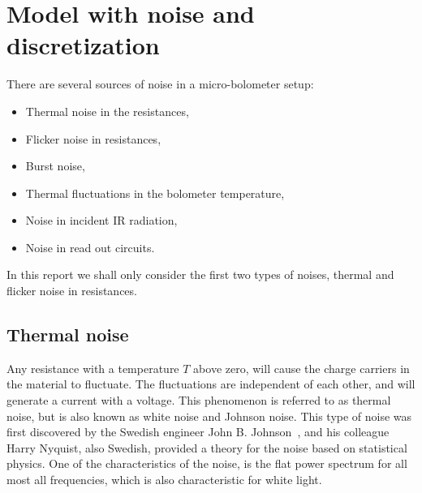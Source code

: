 \section{Model with noise and discretization}

There are several sources of noise in a micro-bolometer setup:
\begin{itemize}
\item Thermal noise in the resistances,
\item Flicker noise in resistances,
\item Burst noise,
\item Thermal fluctuations in the bolometer temperature,
\item Noise in incident IR radiation,
\item Noise in read out circuits.
\end{itemize}

In this report we shall only consider the first two types of noises,
thermal and flicker noise in resistances.

\subsection{Thermal noise}

Any resistance with a temperature $T$ above zero, will cause the
charge carriers in the material to fluctuate. The fluctuations are
independent of each other, and will generate a current with a
voltage. This phenomenon is referred to as thermal noise, but is also
known as white noise and Johnson noise. This type of noise was first
discovered by the Swedish engineer John
B. Johnson~\cite{PhysRev.32.97}, and his colleague Harry Nyquist, also
Swedish, provided a theory for the noise based on statistical
physics\cite{PhysRev.32.110}. One of the characteristics of the noise,
is the flat power spectrum for all most all frequencies, which is also
characteristic for white light.

